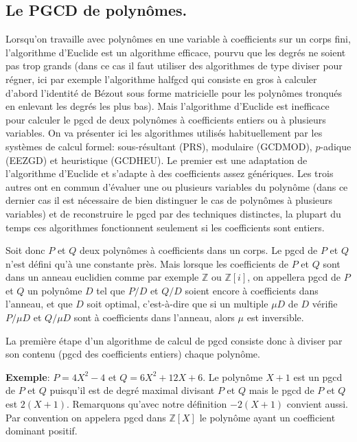 \documentclass[a4paper,11pt]{book}
\begin{document}
\begin{giacjshere}
\chapter{Le PGCD de polynômes.} \label{sec:pgcd} 
Lorsqu'on travaille avec polyn\^omes en une variable
\`a coefficients sur un corps fini, 
l'algorithme d'Euclide est un algorithme efficace, pourvu que les
degr\'es ne soient pas trop grands (dans ce cas il faut utiliser
des algorithmes de type diviser pour r\'egner, ici par exemple
l'algorithme halfgcd qui consiste en gros \`a calculer
d'abord l'identit\'e de B\'ezout sous forme matricielle pour
les polyn\^omes tronqu\'es en enlevant les degr\'es les plus bas).
Mais l'algorithme d'Euclide est
inefficace pour calculer le pgcd de deux polynômes à coefficients entiers
ou \`a plusieurs variables. On
va présenter ici les algorithmes utilisés habituellement par les systèmes de
calcul formel: sous-résultant (PRS), modulaire (GCDMOD), $p$-adique (EEZGD) et
heuristique (GCDHEU). Le premier est une adaptation de l'algorithme d'Euclide
et s'adapte à des coefficients assez génériques. Les trois autres ont en
commun d'évaluer une ou plusieurs variables du polynôme (dans ce dernier cas
il est nécessaire de bien distinguer le cas de polynômes à plusieurs
variables) et de reconstruire le pgcd par des techniques distinctes, la
plupart du temps ces algorithmes fonctionnent seulement si les coefficients
sont entiers.

Soit donc $ P$ et $Q$ deux polynômes à coefficients dans un corps. Le
pgcd de $P$ et $Q$ n'est défini qu'à une constante près. Mais lorsque les
coefficients de $P$ et $Q$ sont dans un anneau euclidien comme par exemple
$\mathbb{Z}$ ou
$\mathbb{Z}[ i ]$, on appellera pgcd de $P$ et $Q$ un polynôme $D$ tel
que $P / D$ et $Q / D$ soient encore à coefficients dans l'anneau, et que $D$
soit optimal, c'est-à-dire que si un multiple $\mu D$ de $D$ vérifie $P / \mu
D$ et $Q / \mu D$ sont à coefficients dans l'anneau, alors $\mu$ est
inversible. 

La première étape d'un algorithme de calcul de pgcd consiste donc
à diviser par son contenu (pgcd des coefficients entiers) chaque polynôme.

{\bf{Exemple}}: $P = 4 X^2 - 4$ et $Q = 6 X^2 + 12 X + 6$. Le polynôme
$X + 1$ est un pgcd de $P$ et $Q$ puisqu'il est de degré maximal divisant $P$
et $Q$ mais le pgcd de $P$ et $Q$ est $2 ( X + 1 )$. Remarquons qu'avec notre
définition $- 2 ( X + 1 )$ convient aussi. Par convention on appelera
pgcd dans $\mathbb{Z}[X]$ le
polynôme ayant un coefficient dominant positif.


\end{giacjshere}
\end{document}
